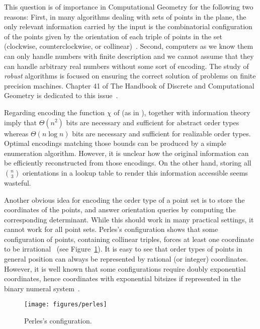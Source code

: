 This question is of importance in Computational Geometry for the following two
reasons:
%
First, in many algorithms dealing with sets of points in the plane,
the only relevant information carried by the input is the combinatorial
configuration of the points given by the orientation of each triple of points in the
set (clockwise, counterclockwise, or collinear)~\cite{Knu92,Ed12,Epp18}.
%
Second, computers as we know them can only handle numbers with
finite description and we cannot assume that they can handle arbitrary
real numbers without some sort of encoding. The study of \emph{robust}
algorithms is focused on ensuring the correct solution of problems on finite
precision machines. Chapter 41 of The Handbook of Discrete and Computational
Geometry is dedicated to this issue~\cite{Ya04}.


Regarding encoding the function \(\chi\) of 
(as in ),
 together with information theory
imply that \(\Theta(n^2)\) bits are necessary
and sufficient for abstract order types whereas \(\Theta(n \log n)\) bits are
necessary and sufficient for realizable order types.
Optimal encodings matching those bounds can be produced
by a simple enumeration algorithm.
%
However, it is unclear how the original information can be
efficiently reconstructed from those encodings.
%
On the other hand, storing all \( \binom{n}{3} \) orientations in a lookup
table to render this information accessible seems wasteful.

Another obvious idea for encoding the order type of a point set is to store
the coordinates of the points, and answer orientation queries
by computing the corresponding determinant. While this should work in many practical
settings, it cannot work for all point sets. Perles's configuration shows that
some configuration of points, containing collinear triples, forces at least one
coordinate to be irrational~\cite{Gr05} (see Figure~\ref{fig:perles}).
%
It is easy to see that
order types of points in general position can always be represented by rational
(or integer) coordinates.
%
However, it is well known that some configurations require doubly
exponential coordinates, hence coordinates with exponential bitsizes if
represented in the binary numeral system~\cite{GPS89}.

\begin{figure}
	\centering{}
	\texttt{[image: figures/perles]}
	\caption{Perles's configuration.}\label{fig:perles}
\end{figure}

